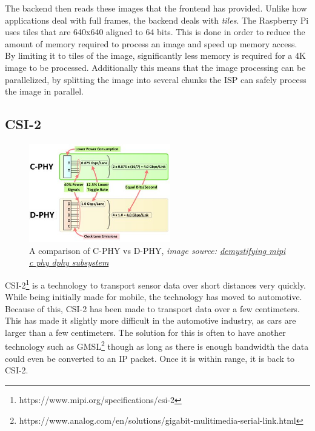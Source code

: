 The backend then reads these images that the frontend has provided. Unlike how
applications deal with full frames, the backend deals with \textit{tiles}. The
Raspberry Pi uses tiles that are 640x640 aligned to 64 bits. This is done in
order to reduce the amount of memory required to process an image and speed up
memory access. By limiting it to tiles of the image, significantly less memory
is required for a 4K image to be processed. Additionally this means that the
image processing can be parallelized, by splitting the image into several
chunks the ISP can safely process the image in parallel.


\subsection{CSI-2}
\begin{figure}
    \begin{center}
        \includegraphics[width=0.55\textwidth]{figures/cphydphy.jpg}
    \end{center}
    \caption{A comparison of C-PHY vs D-PHY, \textit{image source: \href{https://www.design-reuse.com/articles/43954/demystifying-mipi-c-phy-dphy-subsystem.html}{demystifying mipi c phy dphy subsystem}}}
    \label{fig:cphydphycomparison}
\end{figure}

CSI-2\footnote{https://www.mipi.org/specifications/csi-2} is a technology to
transport sensor data over short distances very quickly. While being initially
made for mobile, the technology has moved to automotive. Because of this, CSI-2
has been made to transport data over a few centimeters. This has made it
slightly more difficult in the automotive industry, as cars are larger than a
few centimeters. The solution for this is often to have another technology such
as GMSL\footnote{https://www.analog.com/en/solutions/gigabit-mulitimedia-serial-link.html}
though as long as there is enough bandwidth the data could even be converted to
an IP packet. Once it is within range, it is back to CSI-2.

